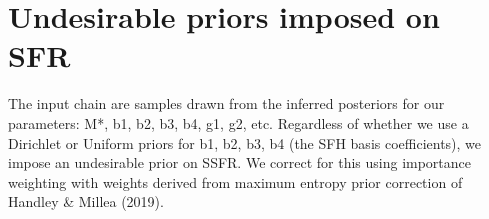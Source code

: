 \section{Undesirable priors imposed on SFR} \label{sec:sfr_priors}
The input chain are samples drawn from the inferred posteriors for our
parameters: M*, b1, b2, b3, b4, g1, g2, etc. Regardless of whether we 
use a Dirichlet or Uniform priors for b1, b2, b3, b4 (the SFH basis
coefficients), we impose an undesirable prior on SSFR. We correct for
this using importance weighting with weights derived from maximum
entropy prior correction of Handley & Millea (2019). 
